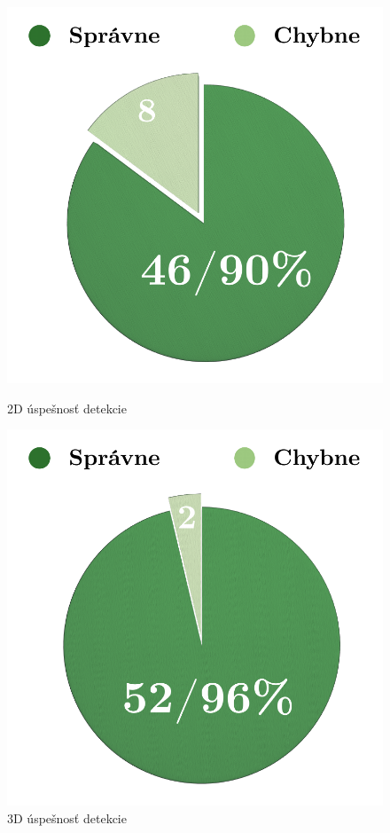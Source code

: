 \begin{figure}[H]
  \centering
  \begin{minipage}[b]{0.43\textwidth}
    \includegraphics[width=\textwidth]{images/2D_graph_medart}
    \caption{2D úspešnosť detekcie}
  \end{minipage}
  \hfill
  \begin{minipage}[b]{0.43\textwidth}
    \includegraphics[width=\textwidth]{images/3D_graph_medart}
    \caption{3D úspešnosť detekcie}
  \end{minipage}
\end{figure}

